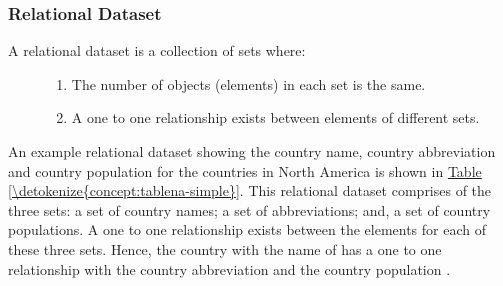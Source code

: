 \documentclass[letterpaper,10pt,english]{sphinxmanual}
\begin{document}
\subsubsection{Relational Dataset}
\label{\detokenize{concept:relational-dataset}}\begin{description}
\item[{A relational dataset is a collection of sets where:}] \leavevmode\begin{enumerate}
\def\theenumi{\arabic{enumi}}
\def\labelenumi{\theenumi .}
\makeatletter\def\p@enumii{\p@enumi \theenumi .}\makeatother
\item {} 
The number of objects (elements) in each set is the same.

\item {} 
A one to one relationship exists between elements of different sets.

\end{enumerate}

\end{description}

An example relational dataset showing the country name, country abbreviation and country population for the countries in North America is shown in \hyperref[\detokenize{concept:tablena-simple}]{Table \ref{\detokenize{concept:tablena-simple}}}.  This relational dataset comprises of the three sets: a set of country names; a set of abbreviations; and, a set of country populations.  A one to one relationship exists between the elements for each of these three sets.  Hence, the country with the name of  has a one to one relationship with the country abbreviation  and the country population .
\end{document}
